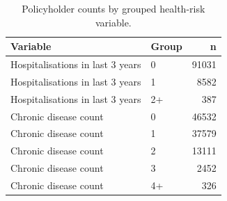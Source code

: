 \begin{table}
\caption{Policyholder counts by grouped health-risk variable.}
\label{tab:01-grouped-health-counts}
\begin{tabular}{llr}
\toprule
Variable & Group & n \\
\midrule
Hospitalisations in last 3 years & 0 & 91031 \\
Hospitalisations in last 3 years & 1 & 8582 \\
Hospitalisations in last 3 years & 2+ & 387 \\
Chronic disease count & 0 & 46532 \\
Chronic disease count & 1 & 37579 \\
Chronic disease count & 2 & 13111 \\
Chronic disease count & 3 & 2452 \\
Chronic disease count & 4+ & 326 \\
\bottomrule
\end{tabular}
\end{table}
